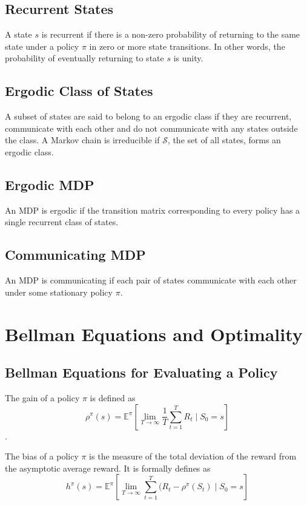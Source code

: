 \subsection{Recurrent States}

A state $s$ is recurrent if there is a non-zero probability of returning to the same state under a policy $\pi$ in zero or more state transitions.
In other words, the probability of eventually returning to state $s$ is unity.

\subsection{Ergodic Class of States}

A subset of states are said to belong to an ergodic class if they are recurrent, communicate with each other and do not communicate with any states outside the class.
A Markov chain is irreducible if $\mathcal{S}$, the set of all states, forms an ergodic class.

\subsection{Ergodic MDP}

An MDP is ergodic if the transition matrix corresponding to every policy has a single recurrent class of states.

\subsection{Communicating MDP}

An MDP is communicating if each pair of states communicate with each other under some stationary policy $\pi$.

\section{Bellman Equations and Optimality}

\subsection{Bellman Equations for Evaluating a Policy}

The gain of a policy $\pi$ is defined as 
$$\rho^\pi(s) = \mathbb{E}^\pi\left[\lim_{T \to \infty} \frac{1}{T} \sum_{t=1}^{T} R_t \mid S_0 = s\right]$$.

The bias of a policy $\pi$ is the measure of the total deviation of the reward from the asymptotic average reward.
It is formally defines as
$$h^\pi(s) = \mathbb{E}^\pi\left[\lim_{T \to \infty} \sum_{t=1}^{T} (R_t - \rho^\pi(S_t) \mid S_0 = s\right]$$

